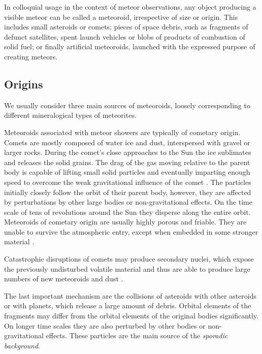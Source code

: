         In colloquial usage in the context of meteor observations, any object producing a visible meteor can be called a meteoroid,
        irrespective of size or origin. This includes small asteroids or comets; pieces of space debris,
        such as fragments of defunct satellites, spent launch vehicles or blobs of products of combustion of solid fuel;
        or finally artificial meteoroids, launched with the expressed purpose of creating meteors.

        \subsection{Origins} \label{iamo}
            We usually consider three main sources of meteoroids, loosely corresponding to different
            mineralogical types of meteorites.

            Meteoroids associated with meteor showers are typically of cometary origin.
            Comets are mostly composed of water ice and dust, interspersed
            with gravel or larger rocks. During the comet's close approaches to the Sun the ice sublimates
            and releases the solid grains. The drag of the gas moving relative to the parent body
            is capable of lifting small solid particles and eventually imparting enough speed
            to overcome the weak gravitational influence of the comet \citep{whipple1951}.
            The particles initially closely follow the orbit of their parent body,
            however, they are affected by perturbations by other large bodies or non-gravitational effects.
            On the time scale of tens of revolutions around the Sun they disperse along the entire orbit.
            Meteoroids of cometary origin are usually highly porous and friable.
            They are unable to survive the atmospheric entry, except when embedded in some stronger material \citep{nittler+2019}.

            Catastrophic disruptions of comets may produce secondary nuclei, which expose
            the previously undisturbed volatile material and thus are able to produce
            large numbers of new meteoroids and dust \citep{jenniskens2006}.

            The last important mechanism are the collisions of asteroids with other asteroids
            or with planets, which release a large amount of debris. Orbital elements of the fragments
            may differ from the orbital elements of the original bodies significantly.
            On longer time scales they are also perturbed by other bodies or non-gravitational effects.
            These particles are the main source of the \emph{sporadic background}.

